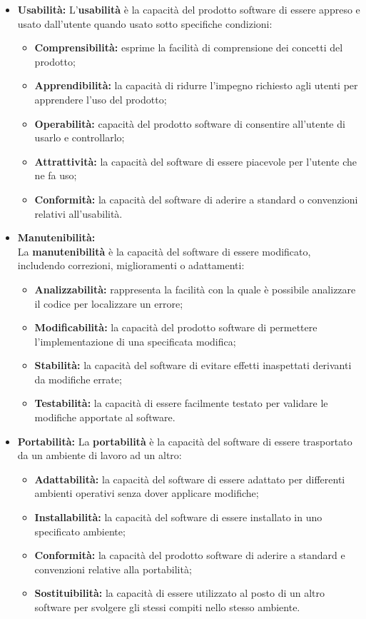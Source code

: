 \begin{flushleft}
\begin{itemize}
\item \textbf{Usabilità:}
L'\textbf{usabilità} è la capacità del prodotto software di essere appreso e usato dall'utente quando usato sotto specifiche condizioni:
\begin{itemize}
	\item \textbf{Comprensibilità:} esprime la facilità di comprensione dei concetti del prodotto;
	\item \textbf{Apprendibilità:} la capacità di ridurre l'impegno richiesto agli utenti per apprendere l'uso del prodotto;
	\item \textbf{Operabilità:} capacità del prodotto software di consentire all'utente di usarlo e controllarlo;
	\item \textbf{Attrattività:} la capacità del software di essere piacevole per l'utente che ne fa uso;
	\item \textbf{Conformità:} la capacità del software di aderire a standard o convenzioni relativi all'usabilità.
\end{itemize}
\item \textbf{Manutenibilità:}\\
La \textbf{manutenibilità} è la capacità del software di essere modificato, includendo correzioni, miglioramenti o adattamenti:
\begin{itemize}
	\item \textbf{Analizzabilità:} rappresenta la facilità con la quale è possibile analizzare il codice per localizzare un errore;
	\item \textbf{Modificabilità:} la capacità del prodotto software di permettere l'implementazione di una specificata modifica;
	\item \textbf{Stabilità:} la capacità del software di evitare effetti inaspettati derivanti da modifiche errate;
	\item \textbf{Testabilità:} la capacità di essere facilmente testato per validare le modifiche apportate al software.
\end{itemize}

\item \textbf{Portabilità:}
La \textbf{portabilità} è la capacità del software di essere trasportato da un ambiente di lavoro ad un altro:
\begin{itemize}
	\item \textbf{Adattabilità:} la capacità del software di essere adattato per differenti ambienti operativi senza dover applicare modifiche;
	\item \textbf{Installabilità:} la capacità del software di essere installato in uno specificato ambiente;
	\item \textbf{Conformità:} la capacità del prodotto software di aderire a standard e convenzioni relative alla portabilità;
	\item \textbf{Sostituibilità:} la capacità di essere utilizzato al posto di un altro software per svolgere gli stessi compiti nello stesso ambiente.
\end{itemize}

\end{itemize}


\end{flushleft}